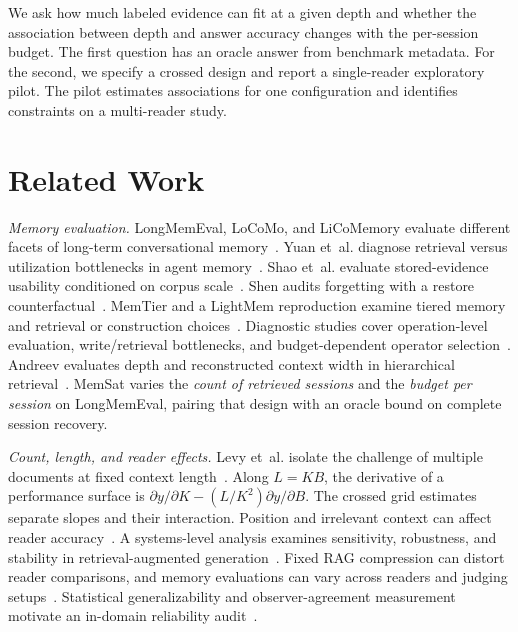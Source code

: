 We ask how much labeled evidence can fit at a given depth and whether the association between depth and answer accuracy changes with the per-session budget. The first question has an oracle answer from benchmark metadata. For the second, we specify a crossed design and report a single-reader exploratory pilot. The pilot estimates associations for one configuration and identifies constraints on a multi-reader study.

\section{Related Work}

\textit{Memory evaluation.} LongMemEval, LoCoMo, and LiCoMemory evaluate different facets of long-term conversational memory~\cite{wu2025longmemeval,maharana2024locomo,huang2026licomemory}. Yuan et~al. diagnose retrieval versus utilization bottlenecks in agent memory~\cite{yuan2026diagnosing}. Shao et~al. evaluate stored-evidence usability conditioned on corpus scale~\cite{shao2026storedevidence}. Shen audits forgetting with a restore counterfactual~\cite{shen2026evictiondestroys}. MemTier and a LightMem reproduction examine tiered memory and retrieval or construction choices~\cite{sidik2026memtier,zhou2026reproducinglightmem}. Diagnostic studies cover operation-level evaluation, write/retrieval bottlenecks, and budget-dependent operator selection~\cite{liu2026evalmem,yu2026whenloss,kang2026retainconsolidate}. Andreev evaluates depth and reconstructed context width in hierarchical retrieval~\cite{andreev2026depthwidth}. MemSat varies the \emph{count of retrieved sessions} and the \emph{budget per session} on LongMemEval, pairing that design with an oracle bound on complete session recovery.

\textit{Count, length, and reader effects.} Levy et~al. isolate the challenge of multiple documents at fixed context length~\cite{levy2025moredocuments}. Along $L=KB$, the derivative of a performance surface is $\partial y/\partial K-(L/K^2)\partial y/\partial B$. The crossed grid estimates separate slopes and their interaction. Position and irrelevant context can affect reader accuracy~\cite{liu2024lostmiddle,hong2025contextrot}. A systems-level analysis examines sensitivity, robustness, and stability in retrieval-augmented generation~\cite{systems2026ragstability}. Fixed RAG compression can distort reader comparisons, and memory evaluations can vary across readers and judging setups~\cite{panthi2026fixedrag,chanhnourack2026auditing}. Statistical generalizability and observer-agreement measurement motivate an in-domain reliability audit~\cite{liu2025kappa0118,landis1977measurement}.

